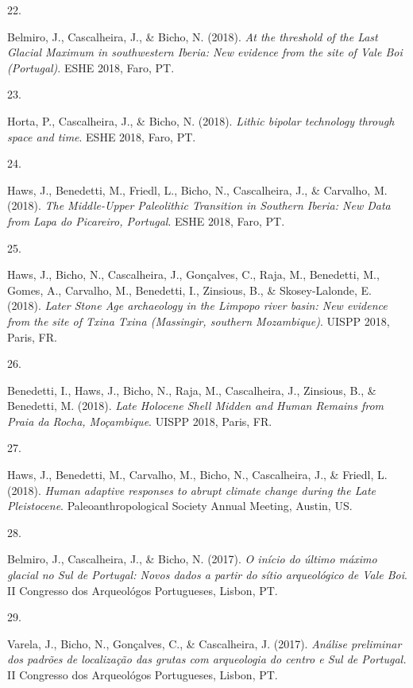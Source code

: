 \documentclass[11pt,a4paper,]{awesome-cv}
\newlength{\cslhangindent}
\newlength{\csllabelwidth}
\newenvironment{CSLReferences}[2] %
 {\begin{list}{}{%
  \setlength{\itemindent}{0pt}
  \setlength{\leftmargin}{0pt}
  \setlength{\parsep}{0pt}
  \ifodd #1
   \setlength{\leftmargin}{\cslhangindent}
   \setlength{\itemindent}{-1\cslhangindent}
  \fi
  \setlength{\itemsep}{#2\baselineskip}}}
 {\end{list}}
\newcommand{\CSLLeftMargin}[1]{\parbox[t]{\csllabelwidth}{\strut#1\strut}}
\newcommand{\CSLRightInline}[1]{\parbox[t]{\linewidth - \csllabelwidth}{\strut#1\strut}}
\begin{document}
\begin{CSLReferences}{0}{0}
\CSLLeftMargin{22. }%
\CSLRightInline{Belmiro, J., Cascalheira, J., \& Bicho, N. (2018).
\emph{At the threshold of the Last Glacial Maximum in southwestern
Iberia: New evidence from the site of Vale Boi (Portugal)}. ESHE 2018,
Faro, PT.}

\CSLLeftMargin{23. }%
\CSLRightInline{Horta, P., Cascalheira, J., \& Bicho, N. (2018).
\emph{Lithic bipolar technology through space and time}. ESHE 2018,
Faro, PT.}

\CSLLeftMargin{24. }%
\CSLRightInline{Haws, J., Benedetti, M., Friedl, L., Bicho, N.,
Cascalheira, J., \& Carvalho, M. (2018). \emph{The Middle-Upper
Paleolithic Transition in Southern Iberia: New Data from Lapa do
Picareiro, Portugal}. ESHE 2018, Faro, PT.}

\CSLLeftMargin{25. }%
\CSLRightInline{Haws, J., Bicho, N., Cascalheira, J., Gonçalves, C.,
Raja, M., Benedetti, M., Gomes, A., Carvalho, M., Benedetti, I.,
Zinsious, B., \& Skosey-Lalonde, E. (2018). \emph{Later Stone Age
archaeology in the Limpopo river basin: New evidence from the site of
Txina Txina (Massingir, southern Mozambique)}. UISPP 2018, Paris, FR.}

\CSLLeftMargin{26. }%
\CSLRightInline{Benedetti, I., Haws, J., Bicho, N., Raja, M.,
Cascalheira, J., Zinsious, B., \& Benedetti, M. (2018). \emph{Late
Holocene Shell Midden and Human Remains from Praia da Rocha,
Moçambique}. UISPP 2018, Paris, FR.}

\CSLLeftMargin{27. }%
\CSLRightInline{Haws, J., Benedetti, M., Carvalho, M., Bicho, N.,
Cascalheira, J., \& Friedl, L. (2018). \emph{Human adaptive responses to
abrupt climate change during the Late Pleistocene}. Paleoanthropological
Society Annual Meeting, Austin, US.}

\CSLLeftMargin{28. }%
\CSLRightInline{Belmiro, J., Cascalheira, J., \& Bicho, N. (2017).
\emph{O início do último máximo glacial no Sul de Portugal: Novos dados
a partir do sítio arqueológico de Vale Boi}. II Congresso dos
Arqueológos Portugueses, Lisbon, PT.}

\CSLLeftMargin{29. }%
\CSLRightInline{Varela, J., Bicho, N., Gonçalves, C., \& Cascalheira, J.
(2017). \emph{Análise preliminar dos padrões de localização das grutas
com arqueologia do centro e Sul de Portugal.} II Congresso dos
Arqueológos Portugueses, Lisbon, PT.}


\end{CSLReferences}
\end{document}
